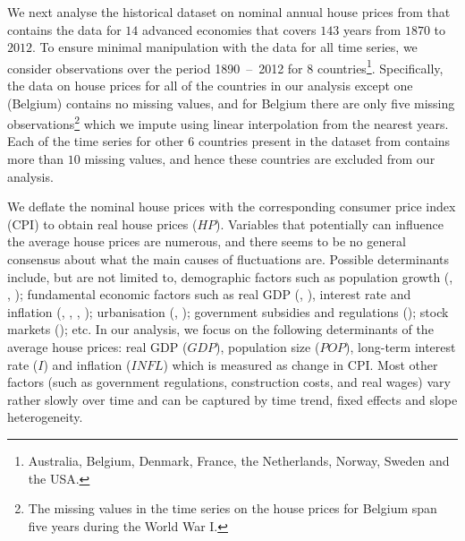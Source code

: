 \documentclass[a4paper,12pt]{article}
\begin{document}
We next analyse the historical dataset on nominal annual house prices from \linebreak\cite{Knoll2017} that contains the data for $14$ advanced economies that covers $143$ years from $1870$ to $2012$.  To ensure minimal manipulation with the data for all time series, we consider observations over the period 1890~--~2012 for 8 countries\footnote{Australia, Belgium, Denmark, France, the Netherlands, Norway, Sweden and the USA.}. Specifically, the data on house prices for all of the countries in our analysis except one (Belgium) contains no missing values, and for Belgium there are only five missing observations\footnote{The missing values in the time series on the house prices for Belgium span five years during the World War I.} which we impute using linear interpolation from the nearest years. Each of the time series for other $6$ countries present in the dataset from \cite{Knoll2017} contains more than $10$ missing values, and hence these countries are excluded from our analysis.



We deflate the nominal house prices with the corresponding consumer price index (CPI) to obtain real house prices ($HP$). Variables that potentially can influence the average house prices are numerous, and there seems to be no general consensus about what the main causes of fluctuations are. Possible determinants include, but are not limited to, demographic factors such as population growth (\citealt{Holly2010}, \citealt{Wang2014}, \citealt{Churchill2021}); fundamental economic factors such as real GDP (\citealt{Huang2013}, \citealt{Churchill2021}), interest rate and inflation (\citealt{Abelson2005}, \citealt{Otto2007}, \citealt{Huang2013}, \citealt{Jorda2015}); urbanisation (\citealt{Chen2011}, \citealt{Wang2017}); government subsidies and regulations (\citealt{Malpezzi1999}); stock markets (\citealt{Gallin2006}); etc. In our analysis, we focus on the following determinants of the average house prices: real GDP ($GDP$), population size ($POP$), long-term interest rate ($I$) and inflation ($INFL$) which is measured as change in CPI. Most other factors (such as government regulations, construction costs, and real wages) vary rather slowly over time and can be captured by time trend, fixed effects and slope heterogeneity.

\end{document}
